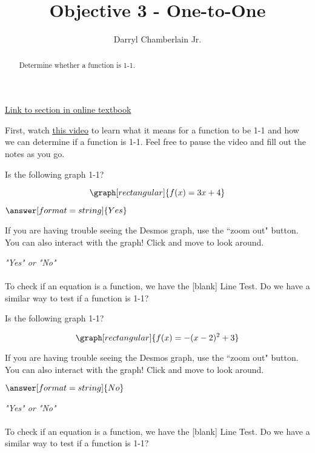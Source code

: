 \documentclass{ximera}
\author{Darryl Chamberlain Jr.}
\title{Objective 3 - One-to-One}
\begin{document}
\begin{abstract}
Determine whether a function is 1-1.
\end{abstract}
\maketitle
 
\href{https://cnx.org/contents/mwjClAV_@8.1:9ZKq0BnY@15/Inverse-Functions}{Link to section in online textbook}
 
 
First, watch
\underline{\href{https://mediasite.video.ufl.edu/Mediasite/Play/38913b95b7e94a1bafa4da5313d1c4cf1d}{this video}} to learn what it means for a function to be 1-1 and how we can determine if a function is 1-1.
Feel free to pause the video and fill out the notes as you go.
 
 
\begin{question}
Is the following graph 1-1?
 
\[
\graph[rectangular]{f(x) = 3x+4}
\]
 
$\answer[format=string]{Yes}$
 
\begin{feedback}
If you are having trouble seeing the Desmos graph, use the ``zoom out" button. You can also interact with the graph! Click and move to look around.
\end{feedback}
 
\begin{hint}
\textit{"Yes" or "No"} \\ \\
To check if an equation is a function, we have the [blank] Line Test. Do we have a similar way to test if a function is 1-1?
\end{hint}
 
\end{question}
 
\begin{question}
Is the following graph 1-1?
 
\[
\graph[rectangular]{f(x) = -(x-2)^2+3}
\]
 
\begin{feedback}
If you are having trouble seeing the Desmos graph, use the ``zoom out" button. You can also interact with the graph! Click and move to look around.
\end{feedback}
 
$\answer[format=string]{No}$
\begin{hint}
\textit{"Yes" or "No"} \\ \\
To check if an equation is a function, we have the [blank] Line Test. Do we have a similar way to test if a function is 1-1?
\end{hint}
 
\end{question}
 
\end{document}
